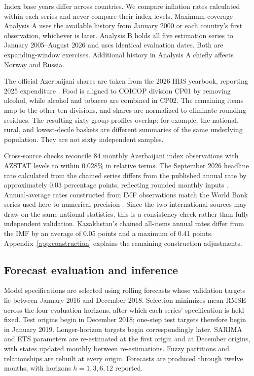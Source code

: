 \documentclass[11pt,a4paper]{article}
\begin{document}
Index base years differ across countries. We compare inflation rates calculated within each series and never compare their index levels. Maximum-coverage Analysis A uses the available history from January 2000 or each country's first observation, whichever is later. Analysis B holds all five estimation series to January 2005--August 2026 and uses identical evaluation dates. Both are expanding-window exercises. Additional history in Analysis A chiefly affects Norway and Russia.

The official Azerbaijani shares are taken from the 2026 HBS yearbook, reporting 2025 expenditure \citep{azstat2026}. Food is aligned to COICOP division CP01 by removing alcohol, while alcohol and tobacco are combined in CP02. The remaining items map to the other ten divisions, and shares are normalized to eliminate rounding residues. The resulting sixty group profiles overlap: for example, the national, rural, and lowest-decile baskets are different summaries of the same underlying population. They are not sixty independent samples.





Cross-source checks reconcile 84 monthly Azerbaijani index observations with AZSTAT levels to within 0.028\% in relative terms. The September 2026 headline rate calculated from the chained series differs from the published annual rate by approximately 0.03 percentage points, reflecting rounded monthly inputs \citep{azprices2026}. Annual-average rates constructed from IMF observations match the World Bank series used here to numerical precision \citep{worldbank2026}. Since the two international sources may draw on the same national statistics, this is a consistency check rather than fully independent validation. Kazakhstan's chained all-items annual rates differ from the IMF by an average of 0.05 points and a maximum of 0.41 points. Appendix~\ref{app:construction} explains the remaining construction adjustments.

\subsection{Forecast evaluation and inference}

Model specifications are selected using rolling forecasts whose validation targets lie between January 2016 and December 2018. Selection minimizes mean RMSE across the four evaluation horizons, after which each series' specification is held fixed. Test origins begin in December 2018; one-step test targets therefore begin in January 2019. Longer-horizon targets begin correspondingly later. SARIMA and ETS parameters are re-estimated at the first origin and at December origins, with states updated monthly between re-estimations. Fuzzy partitions and relationships are rebuilt at every origin. Forecasts are produced through twelve months, with horizons $h=1,3,6,12$ reported.
\end{document}
